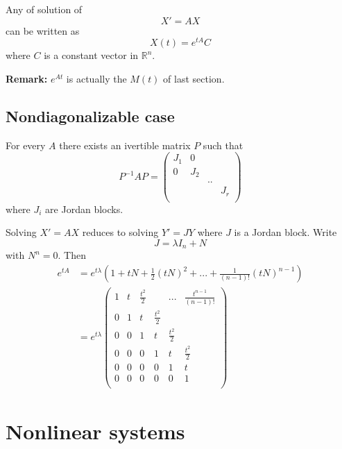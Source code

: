 \begin{itemize}
Any of solution of 
\[X' =AX\]
can be written as
\[X(t)= e^{tA}C\]
where $C$ is a constant vector in $\mathbb R^n$.

\textbf{Remark:} $e^{At}$ is actually the $M(t)$ of last section.
 
\subsection{Nondiagonalizable case}

For every $A$ there exists an ivertible matrix $P$ such that 
\[P^{-1}AP =\begin{pmatrix}
J_1 & 0 & & \\
0 & J_2 & & \\
 & & .. & \\
 & & & J_r\\
\end{pmatrix}\]
where $J_i $ are Jordan blocks.

Solving $X' = AX$ reduces to solving $Y' = JY$ where $J$ is a Jordan block. Write 
\[J = \lambda I_n + N\]
with $N^n =0$. Then 
\[\begin{split}
e^{tA}  & = e^{t\lambda} (1 + tN + \frac{1}{2}(tN)^2 + ... + \frac{1}{(n-1)!}(tN)^{n-1}) \\
	&= e^{t\lambda} \begin{pmatrix} 1 & t & \frac{t^2}{2} &               &  ... & \frac{t^{n-1}}{(n-1)!} \\
					0 & 1 & t             & \frac{t^2}{2} &      &                        \\
					0 & 0 & 1 	      &	t             &  \frac{t^2}{2}      &           \\
					0  & 0  & 	  0    &	       1        &   t   &    \frac{t^2}{2}  \\
					0  & 0   & 	  0    &	          0     &   1   &    t  \\
					0  & 0	& 0	& 0	& 0                       &	1\\			
 			\end{pmatrix}	
\end{split}\]
\end{itemize}



\section{Nonlinear systems}

